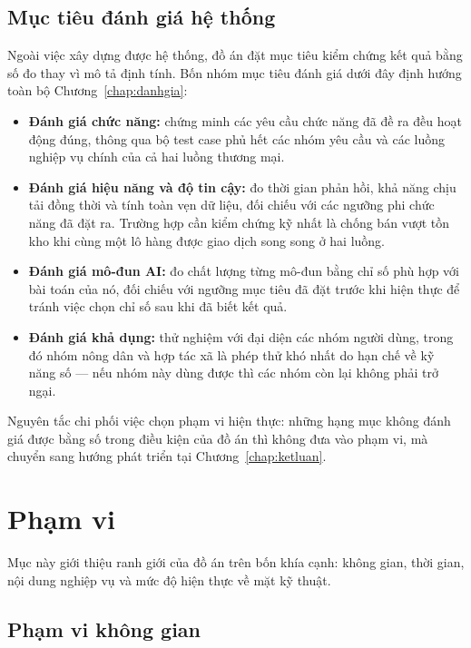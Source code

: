 \subsection{Mục tiêu đánh giá hệ thống}
\label{sec:muctieudanhgia}

Ngoài việc xây dựng được hệ thống, đồ án đặt mục tiêu kiểm chứng kết quả bằng số đo thay vì mô tả định tính. Bốn nhóm mục tiêu đánh giá dưới đây định hướng toàn bộ Chương~\ref{chap:danhgia}:

\begin{itemize}
    \item \textbf{Đánh giá chức năng:} chứng minh các yêu cầu chức năng đã đề ra đều hoạt động đúng, thông qua bộ test case phủ hết các nhóm yêu cầu và các luồng nghiệp vụ chính của cả hai luồng thương mại.
    \item \textbf{Đánh giá hiệu năng và độ tin cậy:} đo thời gian phản hồi, khả năng chịu tải đồng thời và tính toàn vẹn dữ liệu, đối chiếu với các ngưỡng phi chức năng đã đặt ra. Trường hợp cần kiểm chứng kỹ nhất là chống bán vượt tồn kho khi cùng một lô hàng được giao dịch song song ở hai luồng.
    \item \textbf{Đánh giá mô-đun AI:} đo chất lượng từng mô-đun bằng chỉ số phù hợp với bài toán của nó, đối chiếu với ngưỡng mục tiêu đã đặt trước khi hiện thực để tránh việc chọn chỉ số sau khi đã biết kết quả.
    \item \textbf{Đánh giá khả dụng:} thử nghiệm với đại diện các nhóm người dùng, trong đó nhóm nông dân và hợp tác xã là phép thử khó nhất do hạn chế về kỹ năng số --- nếu nhóm này dùng được thì các nhóm còn lại không phải trở ngại.
\end{itemize}

Nguyên tắc chi phối việc chọn phạm vi hiện thực: những hạng mục không đánh giá được bằng số trong điều kiện của đồ án thì không đưa vào phạm vi, mà chuyển sang hướng phát triển tại Chương~\ref{chap:ketluan}.

\section{Phạm vi}
\label{sec:phamvi}

Mục này giới thiệu ranh giới của đồ án trên bốn khía cạnh: không gian, thời gian, nội dung nghiệp vụ và mức độ hiện thực về mặt kỹ thuật.

\subsection{Phạm vi không gian}

